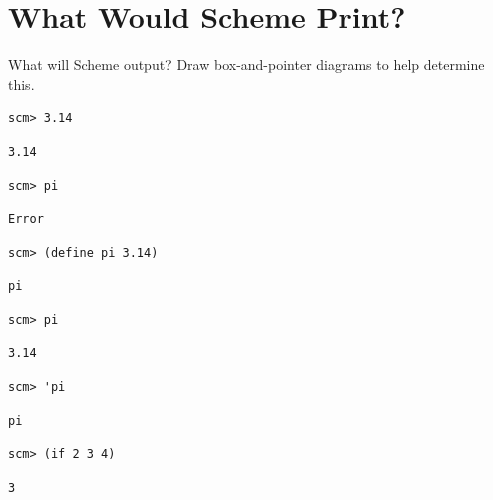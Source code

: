 \documentclass{exam}
\begin{document}
\section{What Would Scheme Print?}
\begin{questions}
\begin{blocksection}
\question What will Scheme output? Draw box-and-pointer diagrams to help determine this.

\begin{lstlisting}
scm> 3.14
\end{lstlisting}
\begin{solution}[0.25in]
\begin{lstlisting}
3.14
\end{lstlisting}
\end{solution}

\begin{lstlisting}
scm> pi
\end{lstlisting}
\begin{solution}[0.25in]
\begin{lstlisting}
Error
\end{lstlisting}
\end{solution}

\begin{lstlisting}
scm> (define pi 3.14)
\end{lstlisting}
\begin{solution}[0.25in]
\begin{lstlisting}
pi
\end{lstlisting}
\end{solution}

\begin{lstlisting}
scm> pi
\end{lstlisting}
\begin{solution}[.25in]
\begin{lstlisting}
3.14
\end{lstlisting}
\end{solution}

\begin{lstlisting}
scm> 'pi
\end{lstlisting}
\begin{solution}[.25in]
\begin{lstlisting}
pi
\end{lstlisting}
\end{solution}

\begin{lstlisting}
scm> (if 2 3 4)
\end{lstlisting}
\begin{solution}[.25in]
\begin{lstlisting}
3
\end{lstlisting}
\end{solution}


\end{blocksection}
\end{questions}
\end{document}
